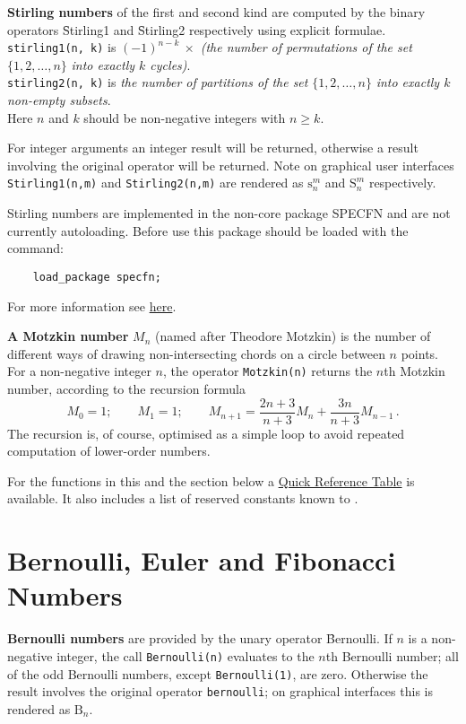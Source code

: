 \hypertarget{operator:Stirling1}{}\hypertarget{operator:Stirling2}{}
\textbf{Stirling numbers} of the first and second kind are computed
by the binary operators \f{Stirling1} and \f{Stirling2}
respectively using explicit formulae.
\texttt{stirling1(n, k)} is $(-1)^{n-k}\ \times$
\emph{(the number of permutations of the set} $\{1, 2, \ldots, n\}$
\emph{into exactly $k$ cycles)}.\\
\texttt{stirling2(n, k)} is \emph{the number of partitions of the set}
$\{1, 2, \ldots, n\}$ \emph{into exactly $k$ non-empty subsets}.\\
Here $n$ and $k$ should be non-negative integers with $n \geq k$.

For integer arguments an integer result will be
returned, otherwise a result involving the original operator will be returned.
Note on graphical user interfaces \texttt{Stirling1(n,m)} and
\texttt{Stirling2(n,m)} are rendered as
$\mathrm{s}_n^m$ and $\mathrm{S}_n^m$ respectively.

Stirling numbers are implemented in the non-core package SPECFN and are
not currently autoloading. Before use this package should be loaded with the
command:
\begin{verbatim}
    load_package specfn;
\end{verbatim}
For more information see \hyperlink{STIRL}{here}.

\hypertarget{operator:MOTZKIN}{}
\textbf{A Motzkin number} $M_{n}$ (named after Theodore Motzkin) is the
number of different ways of drawing non-intersecting chords on a circle between
$n$ points. For a non-negative integer $n$, the operator \texttt{Motzkin(n)}
returns the $n$th Motzkin number, according to the recursion formula
\[
  M_{0} = 1; \qquad M_{1}=1; \qquad
  M_{n+1} = \frac{2n+3}{n+3}M_{n}+ \frac{3n}{n+3}M_{n-1}\,.
\]
The recursion is, of course, optimised as a simple loop to avoid repeated
computation of lower-order numbers.

For the functions in this and the section below
a \hyperlink{SPECFNTAB5}{Quick Reference Table} is available.
It also includes a list of reserved constants known to {\REDUCE}.

\section{Bernoulli, Euler and Fibonacci Numbers}
\hypertarget{operator:BERNOULLI}{}
\textbf{Bernoulli numbers} are provided by the unary operator
\f{Bernoulli}. If $n$ is a non-negative integer, the call \texttt{Bernoulli(n)}
evaluates to the $n$th Bernoulli number; all of the odd Bernoulli numbers,
except \texttt{Bernoulli(1)}, are zero. Otherwise the result involves the
original operator \texttt{bernoulli}; on graphical interfaces this is rendered
as $\mathrm{B}_n$.


